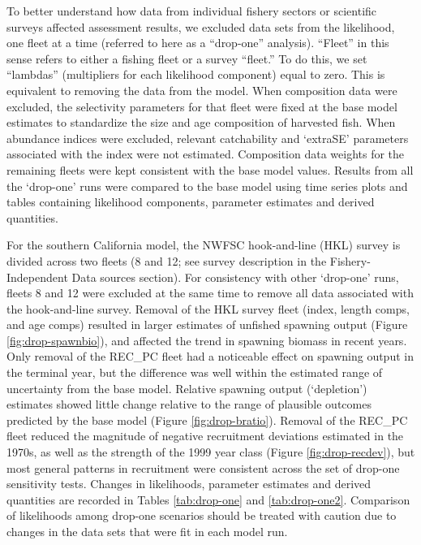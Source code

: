 \documentclass[
  english,
  a4paper,
]{article}
\begin{document}
To better understand how data from individual fishery sectors or scientific surveys affected assessment results, we excluded data sets from the likelihood, one fleet at a time (referred to here as a ``drop-one'' analysis). ``Fleet'' in this sense refers to either a fishing fleet or a survey ``fleet.'' To do this, we set ``lambdas'' (multipliers for each likelihood component) equal to zero. This is equivalent to removing the data from the model. When composition data were excluded, the selectivity parameters for that fleet were fixed at the base model estimates to standardize the size and age composition of harvested fish. When abundance indices were excluded, relevant catchability and `extraSE' parameters associated with the index were not estimated. Composition data weights for the remaining fleets were kept consistent with the base model values. Results from all the `drop-one' runs were compared to the base model using time series plots and tables containing likelihood components, parameter estimates and derived quantities.

For the southern California model, the NWFSC hook-and-line (HKL) survey is divided across two fleets (8 and 12; see survey description in the Fishery-Independent Data sources section). For consistency with other `drop-one' runs, fleets 8 and 12 were excluded at the same time to remove all data associated with the hook-and-line survey. Removal of the HKL survey fleet (index, length comps, and age comps) resulted in larger estimates of unfished spawning output (Figure \ref{fig:drop-spawnbio}), and affected the trend in spawning biomass in recent years. Only removal of the REC\_PC fleet had a noticeable effect on spawning output in the terminal year, but the difference was well within the estimated range of uncertainty from the base model. Relative spawning output (`depletion') estimates showed little change relative to the range of plausible outcomes predicted by the base model (Figure \ref{fig:drop-bratio}). Removal of the REC\_PC fleet reduced the magnitude of negative recruitment deviations estimated in the 1970s, as well as the strength of the 1999 year class (Figure \ref{fig:drop-recdev}), but most general patterns in recruitment were consistent across the set of drop-one sensitivity tests. Changes in likelihoods, parameter estimates and derived quantities are recorded in Tables \ref{tab:drop-one} and \ref{tab:drop-one2}. Comparison of likelihoods among drop-one scenarios should be treated with caution due to changes in the data sets that were fit in each model run.
\end{document}

